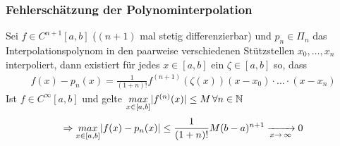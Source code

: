 \subsubsection{Fehlerschätzung der Polynominterpolation}
Sei $f \in C^{n+1} [a, b]$ ($(n+1)$ mal stetig differenzierbar) und $p_n \in \Pi_n$
das Interpolationspolynom in den paarweise verschiedenen Stützstellen $x_0, \dots, x_n$
interpoliert, dann existiert für jedes $x \in [a, b]$ ein $\zeta \in [a, b]$ so, dass
\begin{align*}
  f(x) - p_n(x) = \frac{1}{(1 + n)!} f^{(n+1)}(\zeta(x))(x - x_0)\cdot \dots \cdot(x - x_n)
\end{align*}
Ist $f \in C^\infty [a, b]$ und gelte $\underset{x \in [a, b]}{max} |f^{(n)}(x)| \leq M \, \forall n \in \mathbb{N}$ \\
\begin{align*}
  \Rightarrow \underset{x \in [a, b]}{max} |f(x) - p_n(x)| \leq 
  \frac{1}{(1 + n)!}M(b - a)^{n + 1} \xrightarrow[x\to\,\infty]{} 0
\end{align*}

